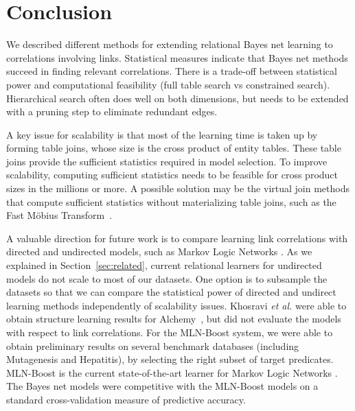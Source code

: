 \documentclass{article}
\begin{document}
\section{Conclusion} We described different methods for extending relational Bayes net learning to correlations involving links. 
Statistical measures indicate that Bayes net methods succeed in finding relevant correlations. 
There is a trade-off between statistical power and computational feasibility (full table search vs constrained search). 
Hierarchical search often does well on both dimensions, but needs to be extended with a pruning step to eliminate redundant edges.

A key issue for scalability is that most of the learning time is taken up by forming table joins, whose size is the cross product of entity tables. 
These table joins provide the sufficient statistics required in model selection. 
To improve scalability, computing sufficient statistics needs to be feasible for cross product sizes in the millions or more. 
A possible solution may be the virtual join methods that compute sufficient statistics without materializing table joins, such as the Fast M\"obius Transform~\cite{Schulte2012b,Yin2004}.

A valuable direction for future work is to compare learning link correlations with directed and undirected models, such as Markov Logic Networks \cite{Domingos2009}. As we explained in Section~\ref{sec:related}, current relational learners for undirected models do not scale to most of our datasets. One option is to subsample the datasets so that we can compare the statistical power of directed and undirect learning methods
independently of scalability issues. Khosravi {\em et al.} were able to obtain structure learning results for Alchemy~\cite{Khosravi2010}, but did not evaluate the models with respect to link correlations. For the MLN-Boost system, we were able to obtain preliminary results on several benchmark databases  (including Mutagenesis and Hepatitis), by selecting the right subset of target predicates. MLN-Boost is the current state-of-the-art learner for Markov Logic Networks \cite{Khot2011}. The Bayes net models were competitive with the MLN-Boost models on a standard cross-validation measure of predictive accuracy.



\end{document}
